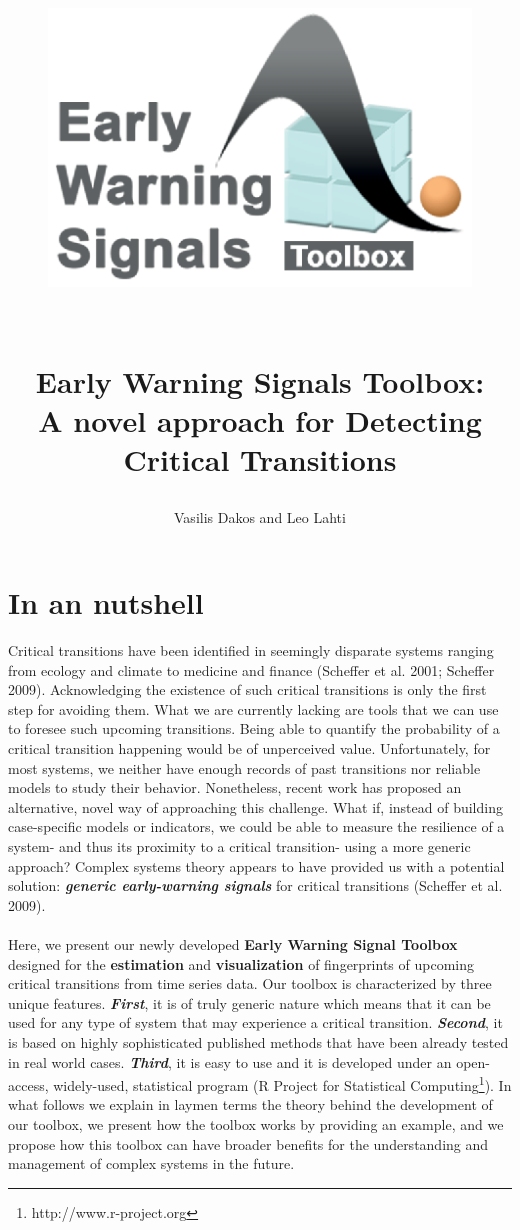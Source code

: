 \documentclass[12pt,a4paper,final]{article}
\author{Vasilis Dakos and Leo Lahti}
\title{
\begin{figure}[h]
\begin{left}
\includegraphics[scale=0.55]{logoEWS.eps}
\end{left}
\end{figure}
\\
Early Warning Signals Toolbox: 
\\ A novel approach for Detecting Critical Transitions
}
\begin{document}
\maketitle

\section{In an nutshell} %
Critical transitions have been identified in seemingly disparate systems ranging from ecology and climate to medicine and finance (Scheffer et al. 2001; Scheffer 2009). %
Acknowledging the existence of such critical transitions is only the first step for avoiding them. What we are currently lacking are tools that we can use to foresee such upcoming transitions. Being able to quantify the probability of a critical transition happening would be of unperceived value. Unfortunately, for most systems, we neither have enough records of past transitions nor reliable models to study their behavior. Nonetheless, recent work has proposed an alternative, novel way of approaching this challenge. What if, instead of building case-specific models or indicators, we could be able to measure the resilience of a system- and thus its proximity to a critical transition- using a more generic approach? Complex systems theory appears to have provided us with a potential solution: \textit{\textbf{generic early-warning signals}} for critical transitions (Scheffer et al. 2009). 
\\
\\
Here, we present our newly developed \textbf{Early Warning Signal Toolbox} designed for the \textbf{estimation} and \textbf{visualization} of fingerprints of upcoming critical transitions from time series data. Our toolbox is characterized by three unique features. \textit{\textbf{First}}, it is of truly generic nature which means that it can be used for any type of system that may experience a critical transition. \textit{\textbf{Second}}, it is based on highly sophisticated published methods that have been already tested in real world cases. \textit{\textbf{Third}}, it is easy to use and it is developed under an open-access, widely-used, statistical program (R Project for Statistical Computing\footnote{http://www.r-project.org}). In what follows we explain in laymen terms the theory behind the development of our toolbox, we present how the toolbox works by providing an example, and we propose how this toolbox can have broader benefits for the understanding and management of complex systems in the future.  
\end{document}
